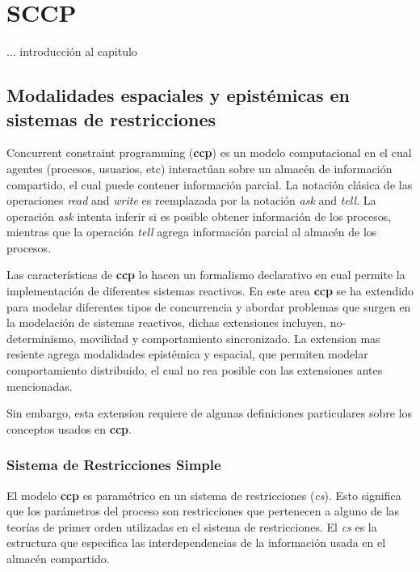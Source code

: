 \chapter{SCCP}
\label{cap3.sccp}      

... introducci\'on al capitulo


\section{Modalidades espaciales y epist\'emicas en sistemas de restricciones}
\label{mod.cap3}

Concurrent constraint programming (\textbf{ccp}) es un modelo computacional en el cual agentes (procesos, usuarios, etc) interact\'uan sobre un almac\'en de informaci\'on compartido, el cual puede contener informaci\'on parcial. La notaci\'on cl\'asica de las operaciones \textit{read} and \textit{write} es reemplazada por la notaci\'on \textit{ask} and \textit{tell}. La operaci\'on \textit{ask} intenta inferir si es posible obtener informaci\'on de los procesos, mientras que la operaci\'on \textit{tell} agrega informaci\'on parcial al almac\'en de los procesos.

Las caracter\'isticas de \textbf{ccp} lo hacen un formalismo declarativo en cual permite la implementaci\'on de diferentes sistemas reactivos. En este area \textbf{ccp} se ha extendido para modelar diferentes tipos de concurrencia y abordar problemas que surgen en la modelaci\'on de sistemas reactivos, dichas extensiones incluyen, no-determinismo, movilidad y comportamiento sincronizado. La extension mas resiente agrega modalidades epist\'emica y espacial, que permiten modelar comportamiento distribuido, el cual no rea posible con las extensiones antes mencionadas.

Sin embargo, esta extension requiere de algunas definiciones particulares sobre los conceptos usados en \textbf{ccp}.

\subsection{Sistema de Restricciones Simple}
\label{srs.cap3}

El modelo \textbf{ccp} es param\'etrico en un sistema de restricciones (\textit{cs}). Esto significa que los par\'ametros del proceso son restricciones que pertenecen a alguno de las teor\'ias de primer orden utilizadas en el sistema de restricciones. El \textit{cs} es la estructura que especifica las interdependencias de la informaci\'on usada en el almac\'en compartido. 

